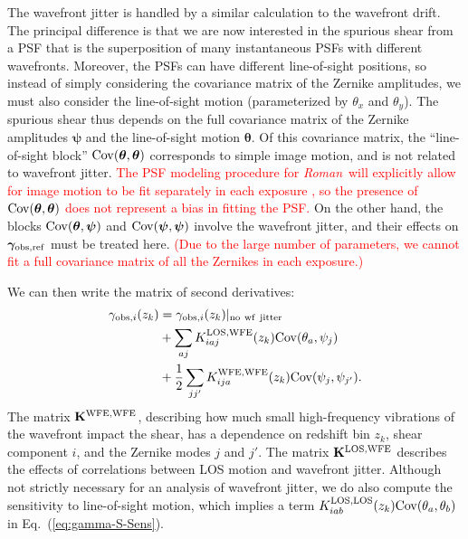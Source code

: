\documentclass[usenatbib]{mnras}
\newcommand{\wfirst}{{\slshape Roman}}
\newcommand{\changetext}[1]{\textcolor{red}{#1}}
\begin{document}
The wavefront jitter is handled by a similar calculation to the
wavefront drift. The principal difference is that we are now
interested in the spurious shear from a PSF that is the superposition
of many instantaneous PSFs with different wavefronts. Moreover, the
PSFs can have different line-of-sight positions, so instead of simply
considering the covariance matrix of the Zernike amplitudes, we must
also consider the line-of-sight motion (parameterized by $\theta_x$
and $\theta_y$). The spurious shear thus depends on the full
covariance matrix of the Zernike amplitudes ${\boldsymbol\psi}$ and
the line-of-sight motion ${\boldsymbol\theta}$. Of this covariance
matrix, the ``line-of-sight block'' ${\rm
Cov}({\boldsymbol\theta},{\boldsymbol\theta})$ corresponds to simple
image motion, and is not related to wavefront jitter. \changetext{The PSF modeling procedure for \wfirst\ will explicitly allow for image motion to be fit separately in each exposure \citep{2012SPIE.8442E..10J}, so the presence of ${\rm
Cov}({\boldsymbol\theta},{\boldsymbol\theta})$ does not represent a bias in fitting the PSF.} On the other
hand, the blocks ${\rm Cov}({\boldsymbol\theta},{\boldsymbol\psi})$
and ${\rm Cov}({\boldsymbol\psi},{\boldsymbol\psi})$ involve the
wavefront jitter, and their effects on ${\boldsymbol\gamma}_{\rm
obs,ref}$ must be treated here. \changetext{(Due to the large number of parameters, we cannot fit a full covariance matrix of all the Zernikes in each exposure.)}

We can then write the matrix of second derivatives:
\begin{align}
\gamma_{{\rm obs},i}(z_k) &= \gamma_{{\rm obs},i}(z_k)|_{\rm no~wf~jitter}\nonumber\\
&+ \sum_{aj} K^{\rm LOS,WFE}_{iaj}(z_k) {\rm Cov}({\theta}_a,{\psi}_j)\nonumber\\
&+ \frac12 \sum_{jj'} K^{\rm WFE,WFE}_{ija}(z_k) {\rm Cov}({\psi}_j,{\psi}_{j'}).
\label{eq:gamma-S-Sens}
\end{align}
The matrix ${\bf K}^{\rm WFE,WFE}$, describing how much small
high-frequency vibrations of the wavefront impact the shear, has a
dependence on redshift bin $z_k$, shear component $i$, and the Zernike
modes $j$ and $j'$. The matrix ${\bf K}^{\rm LOS,WFE}$ describes the
effects of correlations between LOS motion and wavefront jitter.
Although not strictly necessary for an analysis of wavefront jitter, we do also compute the sensitivity to line-of-sight motion, which implies a term $K^{\rm LOS,LOS}_{iab}(z_k) {\rm Cov}({\theta}_a,{\theta}_b)$ in Eq.~(\ref{eq:gamma-S-Sens}).
\end{document}
